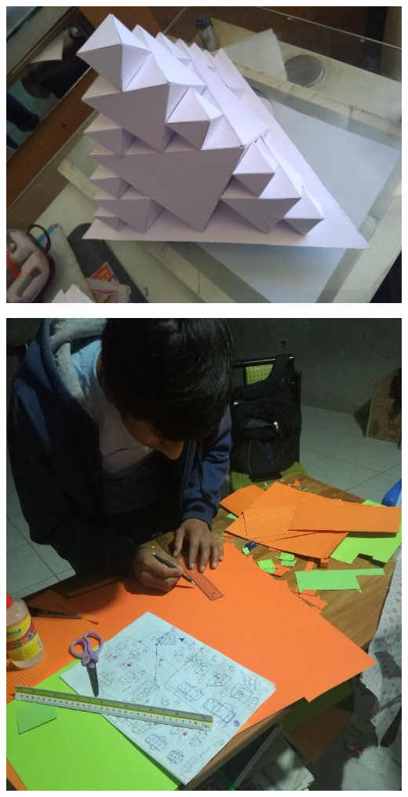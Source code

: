 \documentclass[12pt,]{report}
\begin{document}
\includegraphics{r4.jpeg}

\includegraphics{ff3.jpg}
\end{document}
